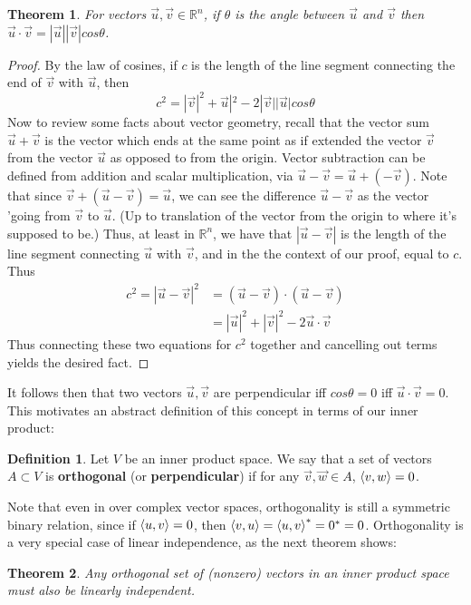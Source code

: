 \documentclass{article}
\theoremstyle{definition}
\newtheorem{definition}{Definition}[section]
\theoremstyle{plain}
\theoremstyle{theorem}
\newtheorem{theorem}{Theorem}[section]
\begin{document}
\begin{theorem}
	For vectors $\vec{u},\vec{v} \in \mathbb{R}^n$, if $\theta$ is the angle between $\vec{u}$ and $\vec{v}$ then $\vec{u}\cdot \vec{v} = |\vec{u}||\vec{v}|cos\theta$.
\end{theorem}
\begin{proof}
	By the law of cosines, if $c$ is the length of the line segment connecting the end of $\vec{v}$ with $\vec{u}$, then 
	\[c^2 = |\vec{v}|^2 + \vec{u}|^2 -2|\vec{v}||\vec{u}|cos\theta \]
	Now to review some facts about vector geometry, recall that the vector sum $\vec{u} + \vec{v}$ is the vector which ends at the same point as if extended the vector $\vec{v}$ from the vector $\vec{u}$ as opposed to from the origin. Vector subtraction can be defined from addition and scalar multiplication, via $\vec{u}-\vec{v} = \vec{u}+(-\vec{v})$. Note that since $\vec{v}+(\vec{u}-\vec{v}) = \vec{u}$, we can see the difference $\vec{u}-\vec{v}$ as the vector 'going from $\vec{v}$ to $\vec{u}$. (Up to translation of the vector from the origin to where it's supposed to be.) Thus, at least in $\mathbb{R}^n$, we have that $|\vec{u}-\vec{v}|$ is the length of the line segment connecting $\vec{u}$ with $\vec{v}$, and in the the context of our proof, equal to $c$. Thus
	\begin{align*}
		c^2 = |\vec{u}-\vec{v}|^2 &= (\vec{u}-\vec{v})\cdot(\vec{u}-\vec{v}) \\
								  &= |\vec{u}|^2 + |\vec{v}|^2 -2\vec{u}\cdot\vec{v}
	\end{align*}
	Thus connecting these two equations for $c^2$ together and cancelling out terms yields the desired fact. 
\end{proof}
It follows then that two vectors $\vec{u},\vec{v}$ are perpendicular iff $cos\theta = 0$ iff $\vec{u}\cdot\vec{v} = 0$. This motivates an abstract definition of this concept in terms of our inner product:
\begin{definition}
	Let $V$ be an inner product space. We say that a set of vectors $A \subset V$ is \textbf{orthogonal} (or \textbf{perpendicular}) if for any $\vec{v},\vec{w} \in A$, $\braket{v,w}=0$.
\end{definition}
Note that even in over complex vector spaces, orthogonality is still a symmetric binary relation, since if $\braket{u,v} = 0$, then $\braket{v,u} = \braket{u,v}^* = 0^* = 0$. Orthogonality is a very special case of linear independence, as the next theorem shows:
\begin{theorem}
	Any orthogonal set of (nonzero) vectors in an inner product space must also be linearly independent.
\end{theorem}
\end{document}
